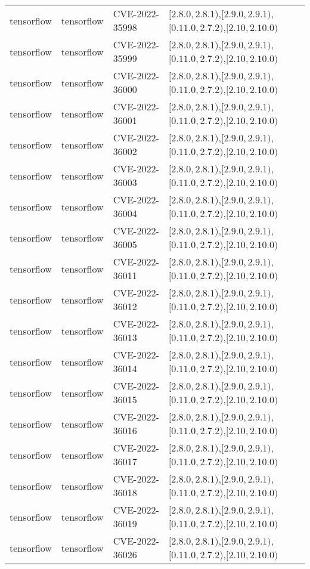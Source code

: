 \begin{tabular}{llll}
tensorflow & tensorflow & CVE-2022-35998 & $[2.8.0,2.8.1)$,$[2.9.0,2.9.1)$,$[0.11.0,2.7.2)$,$[2.10,2.10.0)$ \\
tensorflow & tensorflow & CVE-2022-35999 & $[2.8.0,2.8.1)$,$[2.9.0,2.9.1)$,$[0.11.0,2.7.2)$,$[2.10,2.10.0)$ \\
tensorflow & tensorflow & CVE-2022-36000 & $[2.8.0,2.8.1)$,$[2.9.0,2.9.1)$,$[0.11.0,2.7.2)$,$[2.10,2.10.0)$ \\
tensorflow & tensorflow & CVE-2022-36001 & $[2.8.0,2.8.1)$,$[2.9.0,2.9.1)$,$[0.11.0,2.7.2)$,$[2.10,2.10.0)$ \\
tensorflow & tensorflow & CVE-2022-36002 & $[2.8.0,2.8.1)$,$[2.9.0,2.9.1)$,$[0.11.0,2.7.2)$,$[2.10,2.10.0)$ \\
tensorflow & tensorflow & CVE-2022-36003 & $[2.8.0,2.8.1)$,$[2.9.0,2.9.1)$,$[0.11.0,2.7.2)$,$[2.10,2.10.0)$ \\
tensorflow & tensorflow & CVE-2022-36004 & $[2.8.0,2.8.1)$,$[2.9.0,2.9.1)$,$[0.11.0,2.7.2)$,$[2.10,2.10.0)$ \\
tensorflow & tensorflow & CVE-2022-36005 & $[2.8.0,2.8.1)$,$[2.9.0,2.9.1)$,$[0.11.0,2.7.2)$,$[2.10,2.10.0)$ \\
tensorflow & tensorflow & CVE-2022-36011 & $[2.8.0,2.8.1)$,$[2.9.0,2.9.1)$,$[0.11.0,2.7.2)$,$[2.10,2.10.0)$ \\
tensorflow & tensorflow & CVE-2022-36012 & $[2.8.0,2.8.1)$,$[2.9.0,2.9.1)$,$[0.11.0,2.7.2)$,$[2.10,2.10.0)$ \\
tensorflow & tensorflow & CVE-2022-36013 & $[2.8.0,2.8.1)$,$[2.9.0,2.9.1)$,$[0.11.0,2.7.2)$,$[2.10,2.10.0)$ \\
tensorflow & tensorflow & CVE-2022-36014 & $[2.8.0,2.8.1)$,$[2.9.0,2.9.1)$,$[0.11.0,2.7.2)$,$[2.10,2.10.0)$ \\
tensorflow & tensorflow & CVE-2022-36015 & $[2.8.0,2.8.1)$,$[2.9.0,2.9.1)$,$[0.11.0,2.7.2)$,$[2.10,2.10.0)$ \\
tensorflow & tensorflow & CVE-2022-36016 & $[2.8.0,2.8.1)$,$[2.9.0,2.9.1)$,$[0.11.0,2.7.2)$,$[2.10,2.10.0)$ \\
tensorflow & tensorflow & CVE-2022-36017 & $[2.8.0,2.8.1)$,$[2.9.0,2.9.1)$,$[0.11.0,2.7.2)$,$[2.10,2.10.0)$ \\
tensorflow & tensorflow & CVE-2022-36018 & $[2.8.0,2.8.1)$,$[2.9.0,2.9.1)$,$[0.11.0,2.7.2)$,$[2.10,2.10.0)$ \\
tensorflow & tensorflow & CVE-2022-36019 & $[2.8.0,2.8.1)$,$[2.9.0,2.9.1)$,$[0.11.0,2.7.2)$,$[2.10,2.10.0)$ \\
tensorflow & tensorflow & CVE-2022-36026 & $[2.8.0,2.8.1)$,$[2.9.0,2.9.1)$,$[0.11.0,2.7.2)$,$[2.10,2.10.0)$ \\

\end{tabular}
